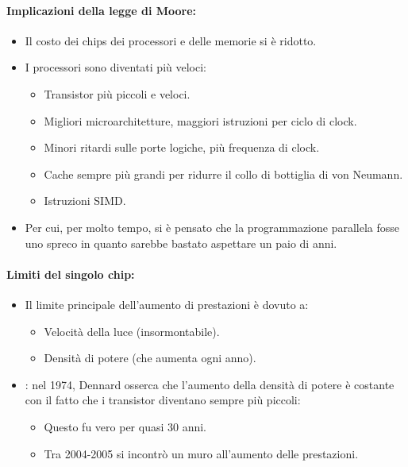 \paragraph{Implicazioni della legge di Moore:}

\begin{itemize}
  \item Il costo dei chips dei processori e delle memorie si è ridotto. 
  \item I processori sono diventati più veloci: 
    \begin{itemize}
      \item Transistor più piccoli e veloci. 
      \item Migliori microarchitetture, maggiori istruzioni per ciclo di clock. 
      \item Minori ritardi sulle porte logiche, più frequenza di clock. 
      \item Cache sempre più grandi per ridurre il collo di bottiglia di von Neumann. 
      \item Istruzioni SIMD.
    \end{itemize}
  \item Per cui, per molto tempo, si è pensato che la programmazione parallela fosse uno spreco in quanto sarebbe bastato aspettare un paio di anni.
\end{itemize}


\paragraph{Limiti del singolo chip:}

\begin{itemize}
  \item Il limite principale dell'aumento di prestazioni è dovuto a: 
    \begin{itemize}
      \item Velocità della luce (insormontabile). 
      \item Densità di potere (che aumenta ogni anno).
    \end{itemize}
  \item {}: nel 1974, Dennard osserca che l'aumento della densità di potere è costante con il fatto che i transistor diventano sempre più piccoli:
    \begin{itemize}
      \item Questo fu vero per quasi 30 anni. 
      \item Tra 2004-2005 si incontrò un muro all'aumento delle prestazioni.
    \end{itemize}
\end{itemize}

